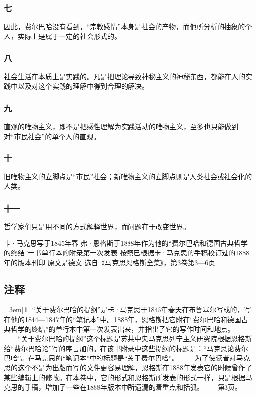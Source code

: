 \documentclass[UTF8,zihao=-4,a4paper]{ctexart}
\begin{document}
\subsubsection*{七}
因此，费尔巴哈没有看到，“宗教感情”本身是社会的产物，而他所分析的抽象的个人，实际上是属于一定的社会形式的。\par
\subsubsection*{八}
社会生活在本质上是实践的。凡是把理论导致神秘主义的神秘东西，都能在人的实践中以及对这个实践的理解中得到合理的解决。\par
\subsubsection*{九}
直观的唯物主义，即不是把感性理解为实践活动的唯物主义，至多也只能做到对“市民社会”的单个人的直观。\par
\subsubsection*{十}
旧唯物主义的立脚点是“市民”社会；新唯物主义的立脚点则是人类社会或社会化的人类。\par
\subsubsection*{十一}
哲学家们只是用不同的方式解释世界，而问题在于改变世界。\par
卡·马克思写于1845年春 
 弗·恩格斯于1888年作为他的“费尔巴哈和德国古典哲学的终结”一书单行本的附录第一次发表 
 按照已根据卡·马克思的手稿校订过的1888年的版本刊印 
 原文是德文 
 选自《马克思恩格斯全集》，第3卷第3—6页\par
\subsection*{注释}
\noindent\hangindent=3em\textbf{[1]} “关于费尔巴哈的提纲”是卡·马克思于1845年春天在布鲁塞尔写成的，写在他的1844—1847年的“笔记本”中。1888年，恩格斯把它附在“费尔巴哈和德国古典哲学的终结”的单行本中第一次发表出来，并指出了它的写作时间和地点。  　　“关于费尔巴哈的提纲”这个标题是苏共中央马克思列宁主义研究院根据恩格斯给“费尔巴哈论”写的序言加的。在该书附录中这些提纲的标题是：“马克思论费尔巴哈”。在马克思的“笔记本”中的标题是“关于费尔巴哈”。  　　为了使读者对马克思的这个不是为出版而写的文件更容易理解，恩格斯在1888年发表它的时候曾作了某些编辑上的修改。在本卷中，它的形式和恩格斯所发表的形式一样，只是根据马克思的手稿，增加了一些在1888年版本中所遗漏的着重点和括弧。——第3页。\par
\end{document}
